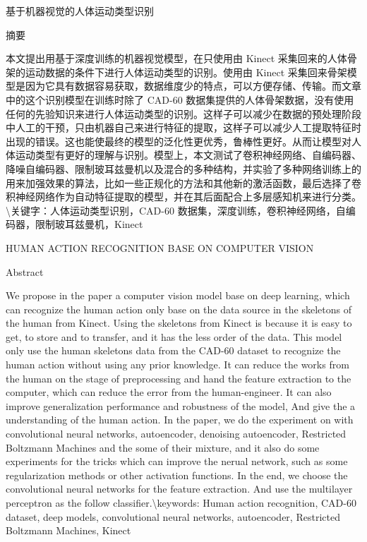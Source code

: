基于机器视觉的人体运动类型识别

摘要

本文提出用基于深度训练的机器视觉模型，在只使用由 Kinect
采集回来的人体骨架的运动数据的条件下进行人体运动类型的识别。使用由
Kinect
采集回来骨架模型是因为它具有数据容易获取，数据维度少的特点，可以方便存储、传输。而文章中的这个识别模型在训练时除了
CAD-60
数据集提供的人体骨架数据，没有使用任何的先验知识来进行人体运动类型的识别。这样子可以减少在数据的预处理阶段中人工的干预，只由机器自己来进行特征的提取，这样子可以减少人工提取特征时出现的错误。这也能使最终的模型的泛化性更优秀，鲁棒性更好。从而让模型对人体运动类型有更好的理解与识别。模型上，本文测试了卷积神经网络、自编码器、降噪自编码器、限制玻耳兹曼机以及混合的多种结构，并实验了多种网络训练上的用来加强效果的算法，比如一些正规化的方法和其他新的激活函数，最后选择了卷积神经网络作为自动特征提取的模型，并在其后面配合上多层感知机来进行分类。\textbackslash{}关键字：人体运动类型识别，CAD-60
数据集，深度训练，卷积神经网络，自编码器，限制玻耳兹曼机，Kinect

HUMAN ACTION RECOGNITION BASE ON COMPUTER VISION

Abstract

We propose in the paper a computer vision model base on deep learning,
which can recognize the human action only base on the data source in the
skeletons of the human from Kinect. Using the skeletons from Kinect is
because it is easy to get, to store and to transfer, and it has the less
order of the data. This model only use the human skeletons data from the
CAD-60 dataset to recognize the human action without using any prior
knowledge. It can reduce the works from the human on the stage of
preprocessing and hand the feature extraction to the computer, which can
reduce the error from the human-engineer. It can also improve
generalization performance and robustness of the model, And give the a
understanding of the human action. In the paper, we do the experiment on
with convolutional neural networks, autoencoder, denoising autoencoder,
Restricted Boltzmann Machines and the some of their mixture, and it also
do some experiments for the tricks which can improve the nerual network,
such as some regularization methods or other activation functions. In
the end, we choose the convolutional neural networks for the feature
extraction. And use the multilayer perceptron as the follow
classifier.\textbackslash{}keywords: Human action recognition, CAD-60
dataset, deep models, convolutional neural networks, autoencoder,
Restricted Boltzmann Machines, Kinect

